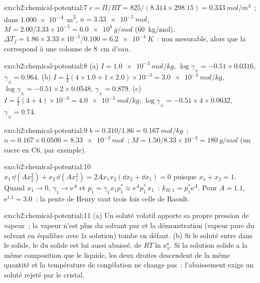 \begin{solution}{exo:b2:chemical-potential:7}
$c = \Pi/RT = 825/(8.314 \times 298.15) = \qty{0.333}{mol/m^3}$~; dans
\qty{1.000e-4}{m^3}, $n = \qty{3.33e-5}{mol}$, $M = 2.00/3.33 \times 10^{-5}
= \qty{6.0e4}{g/mol}$ (\qty{60}{kg/mol}). $\Delta T_f = 1.86 \times 3.33
\times 10^{-5}/0.100 = \qty{6.2e-4}{K}$~: non mesurable, alors que la  correspond à une colonne de \qty{8}{cm} d'eau.
\end{solution}

\begin{solution}{exo:b2:chemical-potential:8}
(a) $I = \qty{1.0e-3}{mol/kg}$, $\log\gamma_\pm = -0.51 \times 0.0316$,
$\gamma_\pm = 0.964$. (b) $I = \frac12(4 \times 1.0 + 1 \times 2.0) \times
10^{-3} = \qty{3.0e-3}{mol/kg}$, $\log\gamma_\pm = -0.51 \times 2 \times 0.0548$,
$\gamma_\pm = 0.879$. (c) $I = \frac12(4 + 4) \times 10^{-3} = \qty{4.0e-3}{mol/kg}$,
$\log\gamma_\pm = -0.51 \times 4 \times 0.0632$, $\gamma_\pm = 0.74$.
\end{solution}

\begin{solution}{exo:b2:chemical-potential:9}
$b = 0.310/1.86 = \qty{0.167}{mol/kg}$~; $n = 0.167 \times 0.0500 =
\qty{8.33e-3}{mol}$~; $M = 1.50/8.33 \times 10^{-3} = \qty{180}{g/mol}$ (un
sucre en C6, par exemple).
\end{solution}

\begin{solution}{exo:b2:chemical-potential:10}
$x_1\,\dd(Ax_2^2) + x_2\,\dd(Ax_1^2) = 2Ax_1x_2(\dd x_2 + \dd x_1) = 0$ puisque
$x_1 + x_2 = 1$. Quand $x_1 \to 0$, $\gamma_1 \to \mathrm e^{A}$ et $p_1 =
\gamma_1x_1p_1^* \approx \mathrm e^{A}p_1^*\,x_1$~: $k_{H,1} = p_1^*\mathrm e^A$.
Pour $A = 1.1$, $\mathrm e^{1.1} = 3.0$~: la pente de Henry vaut trois fois celle de Raoult.
\end{solution}

\begin{solution}{exo:b2:chemical-potential:11}
(a) Un soluté volatil apporte sa propre pression de vapeur~; la vapeur n'est plus
du solvant pur et la démonstration (vapeur pure du solvant en
équilibre avec la solution) tombe en défaut. (b) Si le soluté entre dans le solide, le
 du solide est lui aussi abaissé, de $RT\ln x_1^{\text{s}}$. Si la
solution solide a la même composition que le liquide, les deux droites descendent
de la même quantité et la température de congélation ne change pas~: l'abaissement
exige un soluté rejeté par le cristal.
\end{solution}

